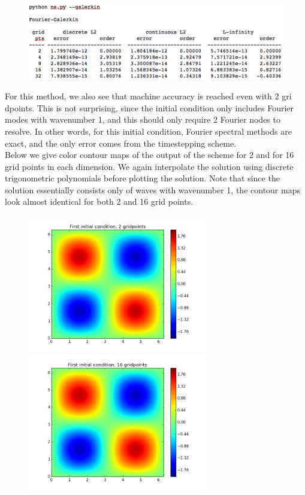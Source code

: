 \documentclass[12pt]{article}
\begin{document}
\begin{figure}[H]
\includegraphics[width=16cm]{images/FourierGalerkin.png}
\end{figure}

For this method, we also see that machine accuracy is reached even with 2 gri dpoints. This is not surprising, since the initial condition only includes Fourier modes with wavenumber 1, and this should only require 2 Fourier nodes to resolve. In other words, for this initial condition, Fourier spectral methods are exact, and the only error comes from the timestepping scheme. \\

Below we give color contour maps of the output of the scheme for 2 and for 16 grid points in each dimension. We again interpolate the solution using discrete trigonometric polynomials before plotting the solution. Note that since the solution essentially consists only of waves with wavenumber 1, the contour maps look almost identical for both 2 and 16 grid points.

\begin{figure}[H]
\includegraphics[width=8cm]{images/galerkin2.png}
\includegraphics[width=8cm]{images/galerkin16.png}
\end{figure}
\end{document}
